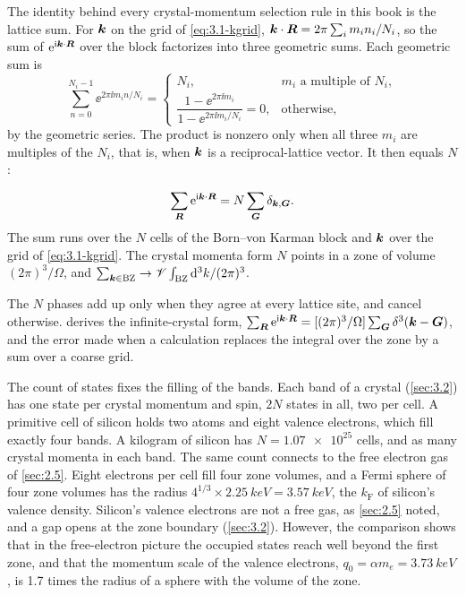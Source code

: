 The identity behind every crystal-momentum selection rule in this book is the lattice sum. For $\bm{k}$ on the grid of \cref{eq:3.1-kgrid}, $\bm{k}\cdot\bm{R} = 2\pi\sum_im_in_i/N_i$, so the sum of $\mathrm{e}^{\mathrm{i}\bm{k}\cdot\bm{R}}$ over the block factorizes into three geometric sums. Each geometric sum is
\begin{equation*}
  \sum_{n=0}^{N_i - 1}\ee^{2\pi\ii m_in/N_i} =
  \begin{cases} N_i, & m_i \text{ a multiple of } N_i, \\[2pt] \dfrac{1 - \ee^{2\pi\ii m_i}}{1 - \ee^{2\pi\ii m_i/N_i}} = 0, & \text{otherwise}, \end{cases}
\end{equation*}
by the geometric series. The product is nonzero only when all three $m_i$ are multiples of the $N_i$, that is, when $\bm{k}$ is a reciprocal-lattice vector. It then equals $N$:
\begin{keyresult}
\begin{equation}
  \sum_{\bm{R}}\mathrm{e}^{\mathrm{i}\bm{k}\cdot\bm{R}} = N\sum_{\bm{G}}\delta_{\bm{k},\bm{G}} .
  \label{eq:3.1-latticesum}
\end{equation}
The sum runs over the $N$ cells of the Born--von Karman block and $\bm{k}$ over the grid of \cref{eq:3.1-kgrid}. The crystal momenta form $N$ points in a zone of volume $(2\pi)^3/\Omega$, and $\sum_{\bm{k}\in\mathrm{BZ}} \to \mathscr{V}\int_{\mathrm{BZ}}\mathrm{d}^3k/(2\pi)^3$.
\end{keyresult}
The $N$ phases add up only when they agree at every lattice site, and cancel otherwise.  derives the infinite-crystal form, $\sum_{\bm{R}}\mathrm{e}^{\mathrm{i}\bm{k}\cdot\bm{R}} = [(2\pi)^3/\Omega]\sum_{\bm{G}}\delta^3(\bm{k} - \bm{G})$, and the error made when a calculation replaces the integral over the zone by a sum over a coarse grid.

The count of states fixes the filling of the bands. Each band of a crystal (\cref{sec:3.2}) has one state per crystal momentum and spin, $2N$ states in all, two per cell. A primitive cell of silicon holds two atoms and eight valence electrons, which fill exactly four bands. A kilogram of silicon has $N = \num{1.07e25}$ cells, and as many crystal momenta in each band. The same count connects to the free electron gas of \cref{sec:2.5}. Eight electrons per cell fill four zone volumes, and a Fermi sphere of four zone volumes has the radius $4^{1/3} \times \SI{2.25}{keV} = \SI{3.57}{keV}$, the $k_{\mathrm{F}}$ of silicon's valence density. Silicon's valence electrons are not a free gas, as \cref{sec:2.5} noted, and a gap opens at the zone boundary (\cref{sec:3.2}). However, the comparison shows that in the free-electron picture the occupied states reach well beyond the first zone, and that the momentum scale of the valence electrons, $q_0 = \alpha m_e = \SI{3.73}{keV}$, is 1.7 times the radius of a sphere with the volume of the zone.

